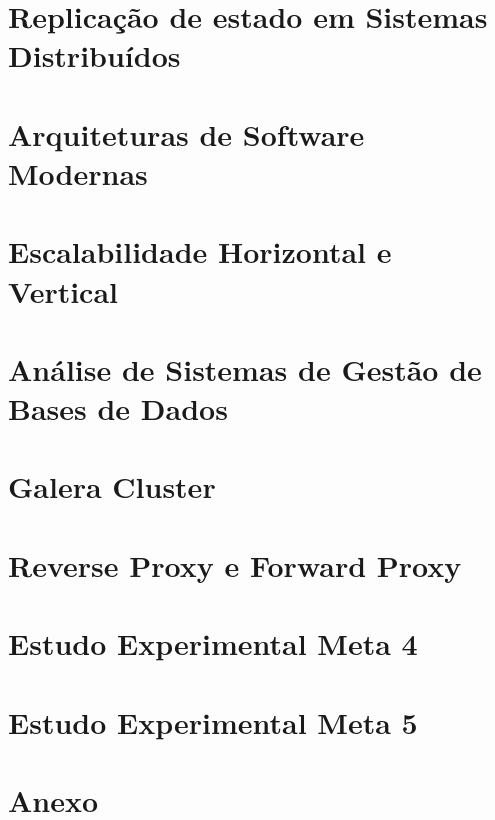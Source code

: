 \documentclass[a4paper,12pt]{report}
\begin{document}
\chapter{Replicação de estado em Sistemas Distribuídos}


\chapter{Arquiteturas de Software Modernas}


\chapter{Escalabilidade Horizontal e Vertical}


\chapter{Análise de Sistemas de Gestão de Bases de Dados}


\chapter{Galera Cluster}


\chapter{Reverse Proxy e Forward Proxy}


\chapter{Estudo Experimental Meta 4}


\chapter{Estudo Experimental Meta 5}


\printbibliography
\clearpage
{}
\appendix
\chapter{Anexo}

\end{document}
